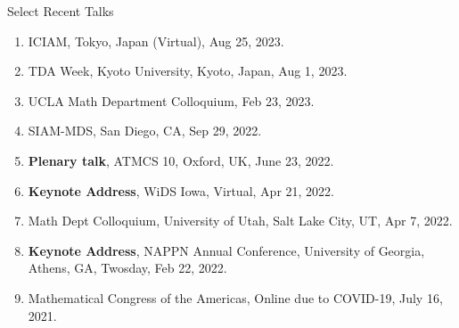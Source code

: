 \documentclass{resume} %
\begin{document}
\begin{rSection}{Select Recent Talks}
\begin{enumerate}
\item ICIAM, Tokyo, Japan (Virtual), Aug 25, 2023. 

\item TDA Week, Kyoto University, Kyoto, Japan, Aug 1, 2023. 

\item UCLA Math Department Colloquium, Feb 23, 2023. 



\item SIAM-MDS, San Diego, CA, Sep 29, 2022. 


\item \textbf{Plenary talk}, ATMCS 10, Oxford, UK, June 23, 2022. 

\item \textbf{Keynote Address}, WiDS Iowa, Virtual, Apr 21, 2022. 

\item Math Dept Colloquium, University of Utah, Salt Lake City, UT, Apr 7, 2022. 

\item \textbf{Keynote Address}, NAPPN Annual Conference, University of Georgia, Athens, GA, Twosday, Feb 22, 2022. 

\item Mathematical Congress of the Americas, Online due to COVID-19, July 16, 2021. 






\end{enumerate}
\end{rSection}


%
\end{document}

